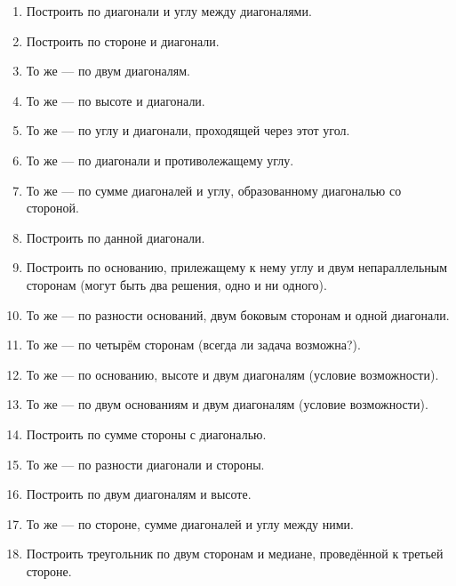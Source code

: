 \documentclass[oneside]{book}
\begin{document}
\begin{enumerate}[resume]
 \item
Построить  по диагонали и углу между диагоналями.

 \item
Построить  по стороне и диагонали.

 \item
То же — по двум диагоналям.

 \item
То же — по высоте и диагонали.

 \item
То же — по углу и диагонали, проходящей через этот угол.

 \item
То же — по диагонали и противолежащему углу.

 \item
То же — по сумме диагоналей и углу, образованному диагональю со стороной.

 \item
Построить  по данной диагонали.

 \item
Построить  по основанию, прилежащему к нему углу и двум непараллельным сторонам (могут быть два решения, одно и ни одного).

 \item
То же — по разности оснований, двум боковым сторонам и одной диагонали.

 \item
То же — по четырём сторонам (всегда ли задача возможна?).

 \item
То же — по основанию, высоте и двум диагоналям (условие возможности).

 \item
То же — по двум основаниям и двум диагоналям (условие возможности).

 \item
Построить  по сумме стороны с диагональю.

 \item
То же — по разности диагонали и стороны.

 \item
Построить  по двум диагоналям и высоте.

 \item
То же — по стороне, сумме диагоналей и углу между ними.

 \item
Построить треугольник по двум сторонам и медиане, проведённой к третьей стороне.


\end{enumerate}
\end{document}
